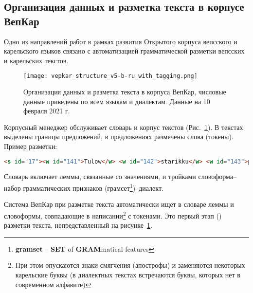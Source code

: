 
\subsection{Организация данных и разметка текста в корпусе ВепКар} \label{sect_exp_tag_vepkar_data_org}

Одно из направлений работ в рамках развития Открытого корпуса вепсского и карельского языков связано с автоматизацией грамматической разметки вепсских и карельских текстов. 

\begin{figure}
    \centering
    \texttt{[image: vepkar\_structure\_v5-b-ru\_with\_tagging.png]}
\caption{Организация данных и разметка текста в корпуса ВепКар, 
числовые данные приведены по всем языкам и диалектам. Данные на 10 февраля 2021 г.} \label{fig:corpus_manager_tagging}
\end{figure}

Корпусный менеджер обслуживает  словарь и корпус текстов (Рис.~\ref{fig:corpus_manager_tagging}). В текстах выделены границы предложений, в предложениях размечены слова (токены).  Пример разметки:
\begin{lstlisting}[language=HTML]
<s id="17"><w id="141">Tulow</w> <w id="142">starikku</w> <w id="143">pertih</w>, <w id="144">tuattah</w> <w id="145">se</w>.</s>
\end{lstlisting}

Словарь включает леммы, связанные со значениями, и тройками словоформа--набор грамматических признаков (грамсет\footnote{ \textbf{gramset} -- \textbf{SET} of \textbf{GRAM}matical features})--диалект. 

Система ВепКар при разметке текста автоматически ищет в словаре леммы и словоформы, совпадающие в написании\footnote{ При этом опускаются знаки смягчения (апострофы) и заменяются некоторых карельские буквы (в диалектных текстах встречаются буквы, которых нет в современном алфавите)} с токенами. Это первый этап () разметки текста, непредставленный на рисунке~\ref{fig:corpus_manager_tagging}.  

